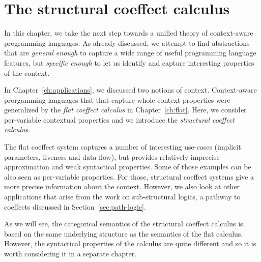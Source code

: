 
\chapter{The structural coeffect calculus} 
\label{ch:structural}

In this chapter, we take the next step towards a unified theory of context-aware programming
languages. As already discussed, we attempt to find abstractions that are \emph{general enough} 
to capture a wide range of useful programming language features, but \emph{specific enough} to 
let us identify and capture interesting properties of the context. 

In Chapter~\ref{ch:applications}, we discussed two notions of context. Context-aware prorgamming
languages that that capture whole-context properties were generalized by the \emph{flat coeffect 
calculus} in Chapter~\ref{ch:flat}. Here, we consider per-variable contextual properties
and we introduce the \emph{structural coeffect calculus}.

The flat coeffect system captures a number of interesting use-cases (implicit parameters, liveness 
and data-flow), but provides relatively imprecise approximation and weak syntactical properties. 
Some of those examples can be also seen as per-variable properties. For those, structural coeffect
systems give a more precise information about the context. However, we also look at other applications 
that arise from the work on sub-structural logics, a pathway to coeffects discussed in 
Section~\ref{sec:path-logic}.

As we will see, the categorical semantics of the structural coeffect calculus is based on the
same underlying structure as the semantics of the flat calculus. However, the syntactical properties
of the calculus are quite different and so it is worth considering it in a separate chapter.


